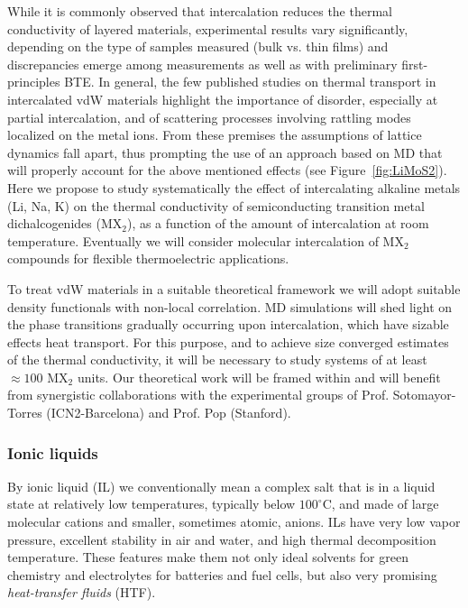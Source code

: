 While it is commonly observed that intercalation reduces the thermal conductivity of layered materials, experimental results vary significantly, depending on the type of samples measured (bulk vs. thin films) and discrepancies emerge among measurements as well as with preliminary first-principles BTE.\cite{Zhu:2016gl,Sood2017}  
In general, the few published studies on thermal transport in intercalated vdW materials highlight the importance of disorder, especially at partial intercalation, and of scattering processes involving rattling modes localized on the metal ions.\cite{Skelton:2016if,Sood2017} From these premises the assumptions of lattice dynamics fall apart, thus prompting the use of an approach based on MD that will properly account for the above mentioned effects (see Figure~\ref{fig:LiMoS2}). Here we propose to study systematically the effect of intercalating alkaline metals (Li, Na, K) on the thermal conductivity of semiconducting transition metal dichalcogenides (MX$_2$), as a function of the amount of intercalation at room temperature. Eventually we will consider molecular intercalation of MX$_2$ compounds for flexible thermoelectric applications. 

To treat vdW materials in a suitable theoretical framework we will adopt suitable density functionals with non-local correlation.\cite{Lindroth:2016dq} 
MD simulations  will shed light on the phase transitions gradually occurring upon intercalation, which have sizable effects heat transport.\cite{Cheng:2014fb} For this purpose, and to achieve size converged estimates of the thermal conductivity, it will be necessary to study systems of at least $\approx 100$ MX$_2$ units.
Our theoretical work will be framed within and will benefit from synergistic collaborations with the experimental groups of Prof. Sotomayor-Torres (ICN2-Barcelona) and Prof. Pop (Stanford).

\subsubsection{Ionic liquids}
By ionic liquid (IL) we conventionally mean a complex salt that is in a liquid state at relatively low temperatures, typically below $100^{\circ}$C, and made of large molecular cations and smaller, sometimes atomic, anions. ILs have very low vapor pressure, excellent stability in air and water, and high thermal decomposition temperature. These features make them not only ideal solvents for green chemistry and electrolytes for batteries and fuel cells, but also very promising \textit{heat-transfer fluids} (HTF).\cite{Armand:2009is,MacFarlane:2014hj}

